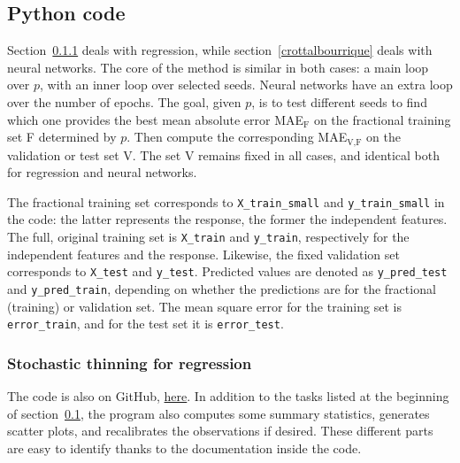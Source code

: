 \documentclass[oneside,10pt]{book}
\begin{document}
\subsection{Python code}\label{pygirleatmen}

Section~\ref{pytrevea} deals with regression, while section~\ref{crottalbourrique} deals with neural networks.  The core of the method is similar in both cases:
  a main loop over $p$, with an inner loop over selected seeds. Neural networks have an extra loop over the number of epochs.  The goal,
  given $p$, is to test different seeds to find which one provides the best mean absolute error MAE$_\text{F}$ on the fractional training set F determined by $p$.
  Then compute the corresponding MAE$_\text{V,F}$ on the validation or test set V. The set V remains fixed in all cases, and identical both for regression and
 neural networks.

The fractional training set corresponds to \texttt{X\_train\_small} and \texttt{y\_train\_small} in the code: the latter represents the response, the former the independent features.
 The full, original training set is \texttt{X\_train} and \texttt{y\_train}, respectively for the independent features and the response.
Likewise, the fixed validation set corresponds to \texttt{X\_test} and \texttt{y\_test}. Predicted values are denoted as
\texttt{y\_pred\_test} and \texttt{y\_pred\_train}, depending on whether the predictions are for the fractional (training) or validation set. The mean square error for the training set is \texttt{error\_train}, and for the test set it is \texttt{error\_test}.


\subsubsection{Stochastic thinning for regression}\label{pytrevea}

The code is also on GitHub, \href{https://github.com/VincentGranville/Statistical-Optimization/blob/main/thinned_regression.py}{here}. In addition to the
 tasks listed at the beginning of section~\ref{pygirleatmen}, the program also computes some summary statistics, generates scatter plots, and recalibrates the
 observations if desired. These different parts are easy to identify thanks to the documentation inside the code.\vspace{1ex}
\end{document}
